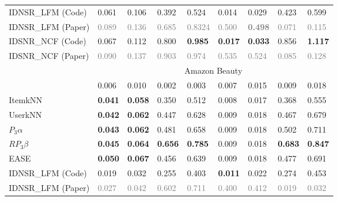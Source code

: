 \documentclass[sigconf,natbib=true,nonacm]{acmart}
\begin{document}
\begin{table}[htbp]
\begin{tabular}{l l l l l l l l l}
        IDNSR\_LFM  (Code)      & 0.061          & 0.106          & 0.392          & 0.524          & 0.014          & 0.029          & 0.423          & 0.599 \\
        IDNSR\_LFM (Paper)      &\textcolor{gray}{0.089}             & \textcolor{gray}{0.136}            & \textcolor{gray}{0.685}         & \textcolor{gray}{ 0.8324}           & \textcolor{gray}{0.500} & \textcolor{gray}{\textbf{0.498}}        & \textcolor{gray}{0.071}            & \textcolor{gray}{0.115} \\
        IDSNR\_NCF  (Code)      & 0.067          & 0.112          & 0.800          & \textbf{0.985} & \textbf{0.017} & \textbf{0.033} & 0.856          & \textbf{1.117} \\
        IDSNR\_NCF (Paper)      & \textcolor{gray}{0.090}            & \textcolor{gray}{0.137}           & \textcolor{gray}{0.903}   & \textcolor{gray}{0.974}  & \textcolor{gray}{0.535} & \textcolor{gray}{0.524} & \textcolor{gray}{0.085}             & \textcolor{gray}{0.128} \\


        \multirow{2}{*}{} & \multicolumn{8}{c}{Amazon Beauty} \\ \hline
        TopPop                  & 0.006          & 0.010          & 0.002         & 0.003         & 0.007           & 0.015         & 0.009         & 0.018 \\
        ItemkNN                 & \textbf{0.041} & \textbf{0.058} & 0.350         & 0.512         & 0.008           & 0.017         & 0.368         & 0.555 \\
        UserkNN                 & \textbf{0.042} & \textbf{0.062} & 0.447         & 0.628         & 0.009           & 0.018         & 0.467         & 0.679 \\
        $P_{3}\alpha$           & \textbf{0.043} & \textbf{0.062} & 0.481         & 0.658         & 0.009           & 0.018         & 0.502         & 0.711 \\
        $RP_{3}\beta$           & \textbf{0.045} & \textbf{0.064} & \textbf{0.656}& \textbf{0.785}& 0.009           & 0.018         & \textbf{0.683}& \textbf{0.847} \\
        EASE                    & \textbf{0.050} & \textbf{0.067} & 0.456         & 0.639         & 0.009           & 0.018         & 0.477         & 0.691 \\ \hline


        IDNSR\_LFM  (Code)      & 0.019          & 0.032          & 0.255          & 0.403        & \textbf{0.011}  & 0.022         & 0.274         & 0.453 \\
        IDNSR\_LFM (Paper)      & \textcolor{gray}{0.027}         & \textcolor{gray}{0.042}                     & \textcolor{gray}{0.602}       & \textcolor{gray}{0.711}           & \textcolor{gray}{0.400} & \textcolor{gray}{0.412} & \textcolor{gray}{0.019}             & \textcolor{gray}{0.032}          \\


\end{tabular}
\end{table}
\end{document}
